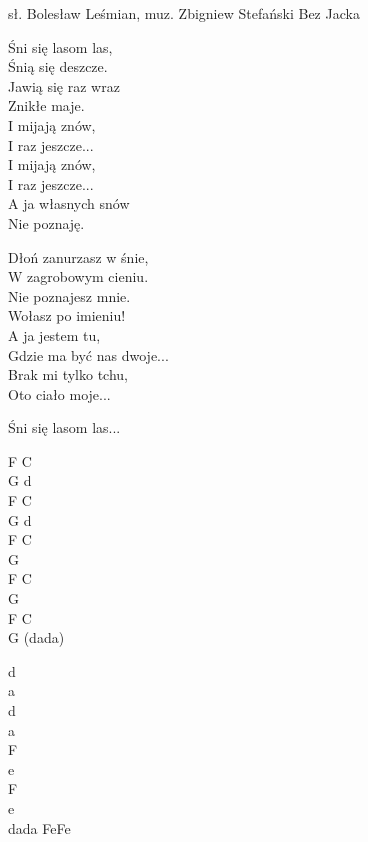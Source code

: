 {sł. Bolesław Leśmian, muz. Zbigniew Stefański}
{Bez Jacka}
\begin{text}
Śni się lasom las,\\
Śnią się deszcze.\\
Jawią się raz wraz \\
Znikłe maje.\\
I mijają znów,\\
I raz jeszcze... \\
I mijają znów, \\
I raz jeszcze... \\
A ja własnych snów \\
Nie poznaję.

Dłoń zanurzasz w śnie,\\
W zagrobowym cieniu.\\
Nie poznajesz mnie.\\
Wołasz po imieniu!\\
A ja jestem tu,\\
Gdzie ma być nas dwoje... \\
Brak mi tylko tchu,\\
Oto ciało moje...

Śni się lasom las...
\end{text}
\begin{chord}
    F C\\
    G d\\
    F C\\
    G d\\
    F C\\
    G\\
    F C\\
    G\\
    F C\\
    G (dada)

    d\\
    a\\
    d\\
    a\\
    F\\
    e\\
    F\\
    e\\
    dada FeFe
\end{chord}